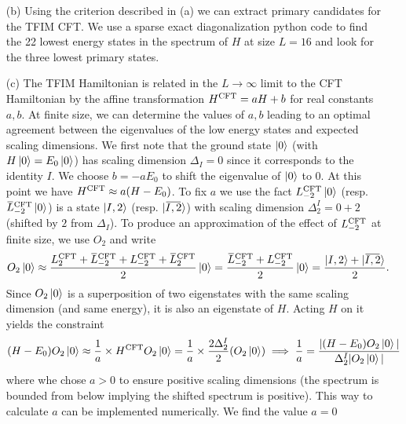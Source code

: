 \documentclass[10pt, a4paper]{article}
\begin{document}
{\begin{enumerate}
  In the finite size spectrum of $H$, the approximate primaries can be found by numerically computing the norm $\epsilon^{(n)}_\varphi \equiv |\Gamma_{\varphi} O_n\ket{\varphi}|$. This norm is zero in the limit $L\to \infty$ iff we have a primary state. For finite $L$, we relax the zero norm condition to a small norm condition. More precisely, we introduce a threshold $\epsilon_{\rm max}$ and declare an eigenstate of $H$ "primary candidate" iff $\epsilon^{(1)}_\varphi + \epsilon^{(2)}_\varphi \leq \epsilon_{\rm max}$. 
  \item[(b)] Using the criterion described in (a) we can extract primary candidates for the TFIM CFT. We use a sparse exact diagonalization python code to find the 22 lowest energy states in the spectrum of $H$ at size $L = 16$ and look for the three lowest primary states. 
  \item[(c)] The TFIM Hamiltonian is related in the $L\to \infty$ limit to the CFT Hamiltonian by the affine transformation $H^{\rm CFT} = a H  + b$ for real constants $a, b$. At finite size, we can determine the values of $a, b$ leading to an optimal agreement between the eigenvalues of the low energy states and expected scaling dimensions. We first note that the ground state $\ket{0}$ (with $H \ket{0} = E_0 \ket{0}$) has scaling dimension $\Delta_I = 0$ since it corresponds to the identity $I$. We choose $b = -a E_0$ to shift the eigenvalue of $\ket{0}$ to $0$. At this point we have $H^{\rm CFT} \approx a (H  - E_0)$. To fix $a$ we use the fact $L^{\rm CFT}_{-2} \ket{0}$ (resp. $\bar{L}^{\rm CFT}_{-2} \ket{0}$) is a state $\ket{I, 2}$ (resp. $\ket{\bar{I, 2}}$) with scaling dimension $\Delta_{2}^{I} = 0 + 2$ (shifted by $2$ from $\Delta_I$). To produce an approximation of the effect of $L_{-2}^{\rm CFT}$ at finite size, we use $O_2$ and write 
  \begin{align*}
    O_2 \ket{0} \approx \frac{L_2^{\rm C F T}+\bar{L}_{-2}^{\rm C F T}+L_{-2}^{\rm C F T}+\bar{L}_2^{\rm C F T}}{2} \ket{0} = \frac{\bar{L}_{-2}^{\rm C F T}+L_{-2}^{\rm C F T}}{2} \ket{0} = \frac{\ket{I, 2} + \ket{\bar{I, 2}}}{2}.
  \end{align*}
  Since $O_2 \ket{0}$ is a superposition of two eigenstates with the same scaling dimension (and same energy), it is also an eigenstate of $H$. Acting $H$ on it yields the constraint 
  \begin{align*}
    (H - E_0) O_2 \ket{0} \approx \frac{1}{a} \times H^{\rm CFT} O_2 \ket{0} = \frac{1}{a} \times \frac{2\Delta_2^I}{2}(O_2 \ket{0}) \implies \frac{1}{a} = \frac{|(H - E_0) O_2 \ket{0}|}{\Delta_2^I|O_2 \ket{0}|}
  \end{align*}
  where whe chose $a > 0$ to ensure positive scaling dimensions (the spectrum is bounded from below implying the shifted spectrum is positive). This way to calculate $a$ can be implemented numerically. We find the value $a = 0$
  

\end{enumerate}}
\end{document}
